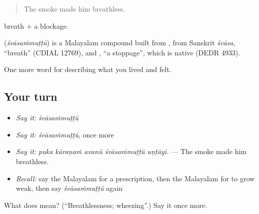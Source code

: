 \begin{quote}
The smoke made him breathless.
\end{quote}

 breath +  a blockage.

\begin{cousinweb}
\textbf{} (\emph{śvāsaṁmuṭṭŭ}) is a Malayalam compound built from , from Sanskrit \emph{śvāsa}, \textquotedblleft{}breath\textquotedblright{} (CDIAL 12769), and , \textquotedblleft{}a stoppage\textquotedblright{}, which is native (DEDR 4933).
\end{cousinweb}

\begin{grammarlens}[title={What you've built}]
One more word for describing what you lived and felt.
\end{grammarlens}

\subsection*{Your turn}
\begin{itemize}
\raggedright
  \item \emph{Say it:} \emph{śvāsaṁmuṭṭŭ}
  \item \emph{Say it:} \emph{śvāsaṁmuṭṭŭ}, once more
  \item \emph{Say it:} \emph{puka kāraṇaṁ avanŭ śvāsaṁmuṭṭŭ uṇṭāyi.} — The smoke made him breathless.
  \item \emph{Recall:} say the Malayalam for a prescription, then the Malayalam for to grow weak, then say \emph{śvāsaṁmuṭṭŭ} again
\end{itemize}

\begin{tcolorbox}[breakable,colback=teal!4,colframe=teal!35!black,title={Before you move on}]
What does  mean? (\textquotedblleft{}Breathlessness; wheezing\textquotedblright{}.) Say it once more.
\end{tcolorbox}
